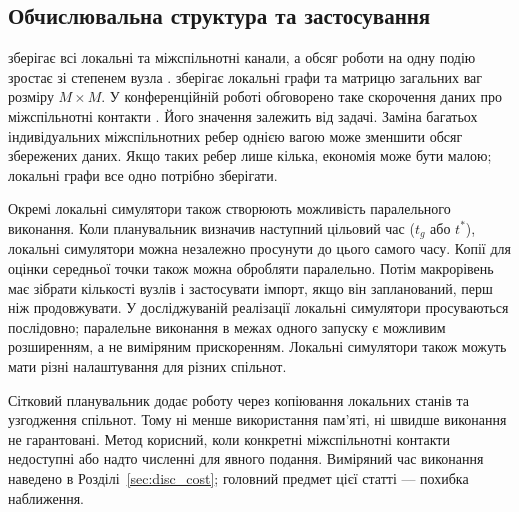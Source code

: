\subsection{Обчислювальна структура та застосування}
\label{sec:cost}

\Full{} зберігає всі локальні та міжспільнотні канали, а обсяг роботи на одну подію зростає зі степенем вузла \citep{kuryliak2025simulating}. \TS{} зберігає локальні графи та матрицю загальних ваг розміру $M\times M$. У конференційній роботі обговорено таке скорочення даних про міжспільнотні контакти \citep{kuryliak2025towards}. Його значення залежить від задачі. Заміна багатьох індивідуальних міжспільнотних ребер однією вагою може зменшити обсяг збережених даних. Якщо таких ребер лише кілька, економія може бути малою; локальні графи все одно потрібно зберігати.

Окремі локальні симулятори також створюють можливість паралельного виконання. Коли планувальник визначив наступний цільовий час ($t_g$ або $t^\ast$), локальні симулятори можна незалежно просунути до цього самого часу. Копії для оцінки середньої точки також можна обробляти паралельно. Потім макрорівень має зібрати кількості вузлів і застосувати імпорт, якщо він запланований, перш ніж продовжувати. У досліджуваній реалізації локальні симулятори просуваються послідовно; паралельне виконання в межах одного запуску є можливим розширенням, а не виміряним прискоренням. Локальні симулятори також можуть мати різні налаштування для різних спільнот.

Сітковий планувальник додає роботу через копіювання локальних станів та узгодження спільнот. Тому ні менше використання пам'яті, ні швидше виконання не гарантовані. Метод корисний, коли конкретні міжспільнотні контакти недоступні або надто численні для явного подання. Виміряний час виконання наведено в Розділі~\ref{sec:disc_cost}; головний предмет цієї статті --- похибка наближення.

\clearpage
\endgroup
